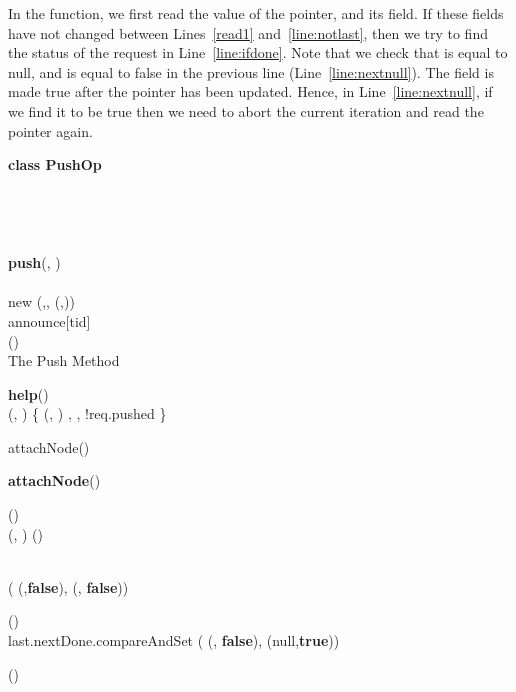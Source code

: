 \documentclass{llncs}
\begin{document}
In the  function, we first read the value of the  pointer, and its  field. 
If these fields have not changed between Lines~\ref{read1} and~\ref{line:notlast}, then we try to find the status of the request in Line~\ref{line:ifdone}. 
Note that we check that  is equal to null, and  is equal to false in the previous line 
(Line~\ref{line:nextnull}). The  field is made true after the  pointer has been updated. Hence, in 
Line~\ref{line:nextnull}, if we find it to be true then we need to abort the current iteration and read the 
 pointer again.
\vspace{-6mm}
\begin{algorithm}[!htb]
\scriptsize
\SetAlgoLined

\textbf{class PushOp}{}\\
		\hspace{5mm} \\
		\hspace{5mm} \\
		\hspace{5mm} \\
 \\
\textbf{push}(, ){} \label{line:push}\\
		  \\
		  new (,, (,)) \\
		announce[tid]  \\
		()\\


\caption{The Push Method} \label{alg:PushOp}



\SetAlgoLined
\textbf{help}(){} \label{line:help}\\
		(, )    \{ (, )  , ,
!req.pushed  \} \\
		 {
			 
		}
		attachNode() \\




\scriptsize
\SetAlgoLined	
\textbf{attachNode}(){}\\
		\While{!}
		{
			  ()\\
			(, )  ()\\ \label{read1}
			\If{ == () \label{line:notlast}} 
			{
				{
					\If{!  	\label{line:ifdone}}  
					{
						  \\
						  ( (,\textbf{false}), (, \textbf{false})) \label{line:pushcas} \\
						
						 {
							
							()\\
							last.nextDone.compareAndSet ( (, \textbf{false}), (null,\textbf{true})) \\
							
						}
					}
				}
					() \label{line:otherupdatetop}
			}
		}

\end{algorithm}
\vspace{-8mm}
\end{document}
